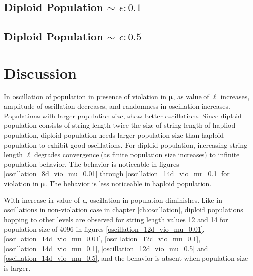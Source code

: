 \subsection{Diploid Population $\mathtt{\sim}$ $\epsilon: 0.1$}

\subsection{Diploid Population $\mathtt{\sim}$ $\epsilon: 0.5$}


\section{Discussion}
In oscillation of population in presence of violation in $\bm{\mu}$, 
as value of $\ell$ increases, amplitude of oscillation decreases, 
and randomness in oscillation increases. 
Populations with larger population size, show better oscillations. 
Since diploid population consists of string length twice the size of string length of hapliod population, 
diploid population needs larger population size than haploid population to exhibit good oscillations. 
For diploid population, increasing string length $\ell$ 
degrades convergence (as finite population size increases) to infinite population behavior. 
The behavior is noticeable in figures 
\ref{oscillation_8d_vio_mu_0.01} through \ref{oscillation_14d_vio_mu_0.1} for violation in $\bm{\mu}$. 
The behavior is less noticeable in haploid population. 

With increase in value of $\bm{\epsilon}$, 
oscillation in population diminishes.  
Like in oscillations in non-violation case in chapter \ref{ch:oscillation}, diploid populations hopping to other levels 
are observed for string length values 12 and 14 for population size of 4096 in 
figures \ref{oscillation_12d_vio_mu_0.01}, \ref{oscillation_14d_vio_mu_0.01}, \ref{oscillation_12d_vio_mu_0.1}, 
\ref{oscillation_14d_vio_mu_0.1}, \ref{oscillation_12d_vio_mu_0.5} and \ref{oscillation_14d_vio_mu_0.5}, 
and the behavior is absent when population size is larger.

